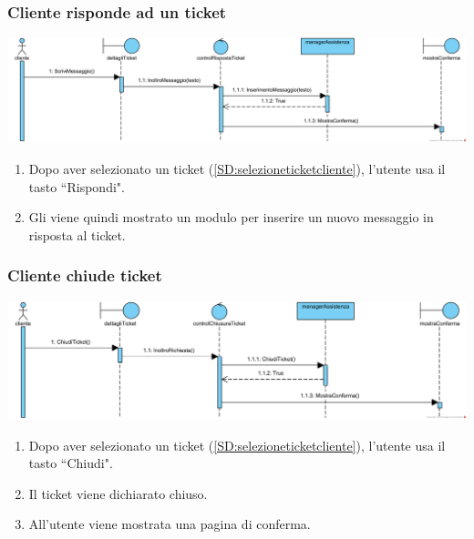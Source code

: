\documentclass[12pt]{article}
\begin{document}
\newpage

\subsubsection{Cliente risponde ad un ticket}
\label{SD:rispostaticketcliente}

\begin{center}
\includegraphics[width=\textwidth]{SequenceDiagram/ClienteTicketRisponde}
\end{center}

\begin{enumerate}
\item Dopo aver selezionato un ticket (\ref{SD:selezioneticketcliente}), l'utente usa il tasto ``Rispondi".
\item Gli viene quindi mostrato un modulo per inserire un nuovo messaggio in risposta al ticket.
\end{enumerate}

\subsubsection{Cliente chiude ticket}
\label{SD:chiusuraticket}

\begin{center}
\includegraphics[width=\textwidth]{SequenceDiagram/ClienteTicketChiusura}
\end{center}

\begin{enumerate}
\item Dopo aver selezionato un ticket (\ref{SD:selezioneticketcliente}), l'utente usa il tasto ``Chiudi".
\item Il ticket viene dichiarato chiuso.
\item All'utente viene mostrata una pagina di conferma.
\end{enumerate}
\end{document}
